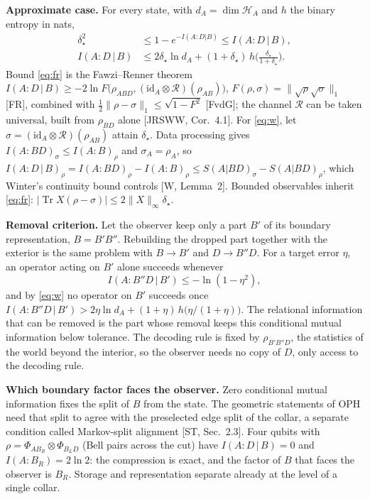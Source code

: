 \documentclass[11pt]{article}
\newcommand{\id}{\mathrm{id}}
\newcommand{\Tr}{\operatorname{Tr}}
\newcommand{\cit}[1]{[#1]}
\begin{document}
\textbf{Approximate case.} For every state, with $d_A=\dim\mathcal H_A$ and $h$ the
binary entropy in nats,
\begin{align}
\delta_\star^2&\le 1-e^{-I(A:D|B)}\le I(A{:}D\,|\,B),\label{eq:fr}\\
I(A{:}D\,|\,B)&\le 2\delta_\star\ln d_A+(1+\delta_\star)\,h\!\bigl(\tfrac{\delta_\star}{1+\delta_\star}\bigr).\label{eq:w}
\end{align}
Bound \eqref{eq:fr} is the Fawzi--Renner theorem
$I(A{:}D\,|\,B)\ge-2\ln F\bigl(\rho_{ABD},(\id_A\otimes\mathcal R)(\rho_{AB})\bigr)$,
$F(\rho,\sigma)=\|\sqrt\rho\sqrt\sigma\|_1$ \cit{FR}, combined with
$\tfrac12\|\rho-\sigma\|_1\le\sqrt{1-F^2}$ \cit{FvdG}; the channel $\mathcal R$ can
be taken universal, built from $\rho_{BD}$ alone \cit{JRSWW, Cor.~4.1}. For
\eqref{eq:w}, let $\sigma=(\id_A\otimes\mathcal R)(\rho_{AB})$ attain $\delta_\star$.
Data processing gives $I(A{:}BD)_\sigma\le I(A{:}B)_\rho$ and $\sigma_A=\rho_A$, so
$I(A{:}D\,|\,B)_\rho=I(A{:}BD)_\rho-I(A{:}B)_\rho\le S(A|BD)_\sigma-S(A|BD)_\rho$,
which Winter's continuity bound controls \cit{W, Lemma~2}. Bounded observables
inherit \eqref{eq:fr}: $|\Tr X(\rho-\sigma)|\le 2\|X\|_\infty\delta_\star$.

\textbf{Removal criterion.} Let the observer keep only a part $B'$ of its boundary
representation, $B=B'B''$. Rebuilding the dropped part together with the exterior is
the same problem with $B\to B'$ and $D\to B''D$. For a target error $\eta$, an
operator acting on $B'$ alone succeeds whenever
\[
I(A{:}B''D\,|\,B')\le-\ln(1-\eta^2),
\]
and by \eqref{eq:w} no operator on $B'$ succeeds once
$I(A{:}B''D\,|\,B')>2\eta\ln d_A+(1+\eta)\,h\bigl(\eta/(1+\eta)\bigr)$. The relational
information that can be removed is the part whose removal keeps this conditional
mutual information below tolerance. The decoding rule is fixed by
$\rho_{B'B''D}$, the statistics of the world beyond the interior, so the observer
needs no copy of $D$, only access to the decoding rule.

\textbf{Which boundary factor faces the observer.} Zero conditional mutual
information fixes the split of $B$ from the state. The geometric statements of OPH
need that split to agree with the preselected edge split of the collar, a separate
condition called Markov-split alignment \cit{ST, Sec.~2.3}. Four qubits with
$\rho=\Phi_{AB_R}\otimes\Phi_{B_LD}$ (Bell pairs across the cut) have
$I(A{:}D\,|\,B)=0$ and $I(A{:}B_R)=2\ln2$: the compression is exact, and the factor
of $B$ that faces the observer is $B_R$. Storage and representation separate
already at the level of a single collar.
\end{document}
